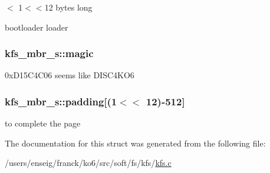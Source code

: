 $<$ 1$<$$<$12 bytes long 

bootloader loader \hypertarget{structkfs__mbr__s_a3dc738aebe7f868555fdbf3375212417}{
\subsubsection[{magic}]{ kfs\-\_\-mbr\-\_\-s\-::magic}}\label{structkfs__mbr__s_a3dc738aebe7f868555fdbf3375212417}


0x\-D15\-C4\-C06 seems like D\-I\-S\-C4\-K\-O6 

\hypertarget{structkfs__mbr__s_aee8bfa85ff1245b61104044fb9a7337d}{
\subsubsection[{padding}]{ kfs\-\_\-mbr\-\_\-s\-::padding\mbox{[}(1$<$$<$ 12)-\/512\mbox{]}}}\label{structkfs__mbr__s_aee8bfa85ff1245b61104044fb9a7337d}


to complete the page 



The documentation for this struct was generated from the following file\-:\begin{DoxyCompactItemize}
\item 
/users/enseig/franck/ko6/src/soft/fs/kfs/\hyperlink{kfs_8c}{kfs.\-c}\end{DoxyCompactItemize}
